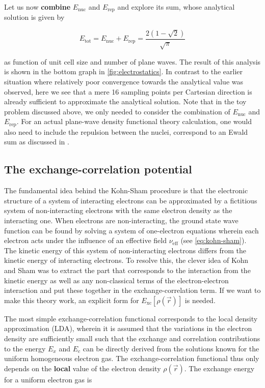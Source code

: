 Let us now \textbf{combine} $E_{\text{nuc}}$ and $E_{\text{rep}}$ and explore its sum, whose analytical solution is given by

\begin{equation}
    E_{\text{tot}} = E_{\text{nuc}} + E_{\text{rep}} = \frac{2 \left( 1 - \sqrt{2} \right)}{\sqrt{\pi}}
\end{equation}

as function of unit cell size and number of plane waves. The result of this analysis is shown in the bottom graph in \cref{fig:electrostatics}. In contrast to the earlier situation where relatively poor convergence towards the analytical value was observed, here we see that a mere 16 sampling points per Cartesian direction is already sufficient to approximate the analytical solution.
Note that in the toy problem discussed above, we only needed to consider the combination of $E_{\text{nuc}}$ and $E_{\text{rep}}$. For an actual plane-wave density functional theory calculation, one would also need to include the repulsion between the nuclei, correspond to an Ewald sum as discussed in .

%
%
%
\subsection{The exchange-correlation potential}

The fundamental idea behind the Kohn-Sham procedure is that the electronic structure of a system of interacting electrons can be approximated by a fictitious system of non-interacting electrons with the same electron density as the interacting one.\cite{1965:kohn} When electrons are non-interacting, the ground state wave function can be found by solving a system of one-electron equations wherein each electron acts under the influence of an effective field $\nu_{\text{eff}}$ (see \cref{eq:kohn-sham}). The kinetic energy of this system of non-interacting electrons differs from the kinetic energy of interacting electrons. To resolve this, the clever idea of Kohn and Sham was to extract the part that corresponds to the interaction from the kinetic energy as well as any non-classical terms of the electron-electron interaction and put these together in the exchange-correlation term. If we want to make this theory work, an explicit form for $E_{\textrm{xc}}[\rho(\vec{r})]$ is needed.

The most simple exchange-correlation functional corresponds to the local density approximation (LDA), wherein it is assumed that the variations in the electron density are sufficiently small such that the exchange and correlation contributions to the energy $E_{x}$ and $E_{c}$ can be directly derived from the solutions known for the uniform homogeneous electron gas. The exchange-correlation functional thus only depends on the \textbf{local} value of the electron density $\rho(\vec{r})$. The exchange energy for a uniform electron gas is

